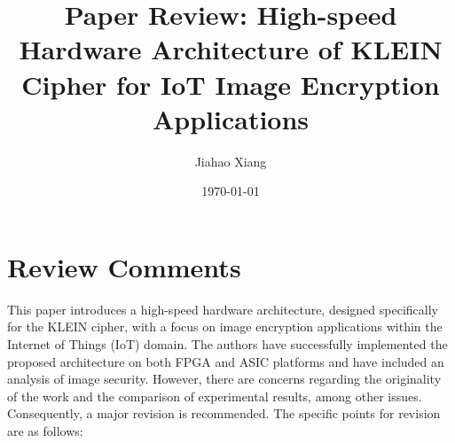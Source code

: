 \documentclass{article}
\title{Paper Review: High-speed Hardware Architecture of KLEIN Cipher for IoT Image Encryption Applications}
\author{Jiahao Xiang}
\date{\today}
\begin{document}
\maketitle


\section{Review Comments}

This paper introduces a high-speed hardware architecture, designed specifically for the KLEIN cipher, with a focus on image encryption applications within the Internet of Things (IoT) domain. The authors have successfully implemented the proposed architecture on both FPGA and ASIC platforms and have included an analysis of image security. However, there are concerns regarding the originality of the work and the comparison of experimental results, among other issues. Consequently, a major revision is recommended. The specific points for revision are as follows:
\end{document}
